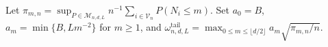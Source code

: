 Let \(\pi_{m,n}=\sup_{P\in\mathcal M_{n,d,L}}n^{-1}\sum_{i\in\mathcal V_n}P(N_i\le m)\). Set \(a_0=B\), \(a_m=\min\{B,Lm^{-2}\}\) for \(m\ge1\), and \(\omega^{\mathrm{tail}}_{n,d,L}=\max_{0\le m\le\lfloor d/2\rfloor}a_m\sqrt{\pi_{m,n}/n}\).